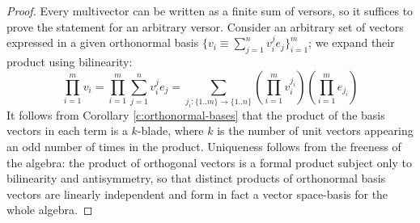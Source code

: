 \begin{proof}
	Every multivector can be written as a finite sum of versors, so it suffices to prove the statement for an arbitrary versor.
	Consider an arbitrary set of vectors expressed in a given orthonormal basis $\{v_i \equiv \sum_{j=1}^n v_i^je_j\}_{i=1}^m$; we expand their product using bilinearity:
	\[\prod_{i=1}^m v_i = \prod_{i=1}^m \sum_{j=1}^n v_i^j e_j = \sum_{j_i : \{1..m\} \to \{1..n\}} \left(\prod_{i=1}^m v_i^{j_i}\right) \left(\prod_{i=1}^m e_{j_i}\right)\]
	It follows from Corollary \ref{c:orthonormal-bases} that the product of the basis vectors in each term is a $k$-blade, where $k$ is the number of unit vectors appearing an odd number of times in the product.
	Uniqueness follows from the freeness of the algebra: the product of orthogonal vectors is a formal product subject only to bilinearity and antisymmetry, so that distinct products of orthonormal basis vectors are linearly independent and form in fact a vector space-basis for the whole algebra.
\end{proof}
